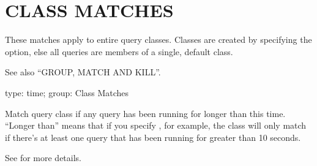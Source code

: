 \documentclass[letterpaper,10pt,english]{sphinxmanual}
\begin{document}
\section{CLASS MATCHES}
\label{\detokenize{mariadb-kill:class-matches}}
These matches apply to entire query classes.  Classes are created by specifying
the {\hyperref[\detokenize{mariadb-kill:cmdoption-mariadb-kill-group-by}]{}} option, else all queries are members of a single, default
class.

See also “GROUP, MATCH AND KILL”.

\begin{fulllineitems}
\label{\detokenize{mariadb-kill:cmdoption-mariadb-kill-any-busy-time}}
type: time; group: Class Matches

Match query class if any query has been running for longer than this time.
“Longer than” means that if you specify , for example, the class will
only match if there’s at least one query that has been running for greater
than 10 seconds.

See {\hyperref[\detokenize{mariadb-kill:cmdoption-mariadb-kill-each-busy-time}]{}} for more details.

\end{fulllineitems}

\end{document}
